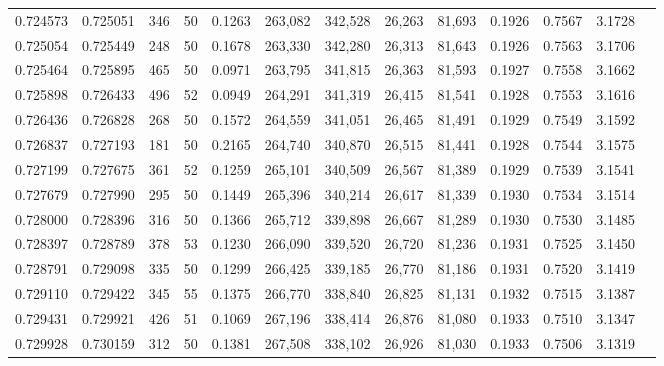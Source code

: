 \begin{tabular}{rrrrrrrrrrrrr}
0.724573 & 0.725051 &   346 &  50 &                                     0.1263 & 263,082 & 342,528 &  26,263 &  81,693 & 0.1926 & 0.7567 & 3.1728 \\
0.725054 & 0.725449 &   248 &  50 &                                     0.1678 & 263,330 & 342,280 &  26,313 &  81,643 & 0.1926 & 0.7563 & 3.1706 \\
0.725464 & 0.725895 &   465 &  50 &                                     0.0971 & 263,795 & 341,815 &  26,363 &  81,593 & 0.1927 & 0.7558 & 3.1662 \\
0.725898 & 0.726433 &   496 &  52 &                                     0.0949 & 264,291 & 341,319 &  26,415 &  81,541 & 0.1928 & 0.7553 & 3.1616 \\
0.726436 & 0.726828 &   268 &  50 &                                     0.1572 & 264,559 & 341,051 &  26,465 &  81,491 & 0.1929 & 0.7549 & 3.1592 \\
0.726837 & 0.727193 &   181 &  50 &                                     0.2165 & 264,740 & 340,870 &  26,515 &  81,441 & 0.1928 & 0.7544 & 3.1575 \\
0.727199 & 0.727675 &   361 &  52 &                                     0.1259 & 265,101 & 340,509 &  26,567 &  81,389 & 0.1929 & 0.7539 & 3.1541 \\
0.727679 & 0.727990 &   295 &  50 &                                     0.1449 & 265,396 & 340,214 &  26,617 &  81,339 & 0.1930 & 0.7534 & 3.1514 \\
0.728000 & 0.728396 &   316 &  50 &                                     0.1366 & 265,712 & 339,898 &  26,667 &  81,289 & 0.1930 & 0.7530 & 3.1485 \\
0.728397 & 0.728789 &   378 &  53 &                                     0.1230 & 266,090 & 339,520 &  26,720 &  81,236 & 0.1931 & 0.7525 & 3.1450 \\
0.728791 & 0.729098 &   335 &  50 &                                     0.1299 & 266,425 & 339,185 &  26,770 &  81,186 & 0.1931 & 0.7520 & 3.1419 \\
0.729110 & 0.729422 &   345 &  55 &                                     0.1375 & 266,770 & 338,840 &  26,825 &  81,131 & 0.1932 & 0.7515 & 3.1387 \\
0.729431 & 0.729921 &   426 &  51 &                                     0.1069 & 267,196 & 338,414 &  26,876 &  81,080 & 0.1933 & 0.7510 & 3.1347 \\
0.729928 & 0.730159 &   312 &  50 &                                     0.1381 & 267,508 & 338,102 &  26,926 &  81,030 & 0.1933 & 0.7506 & 3.1319 \\

\end{tabular}
